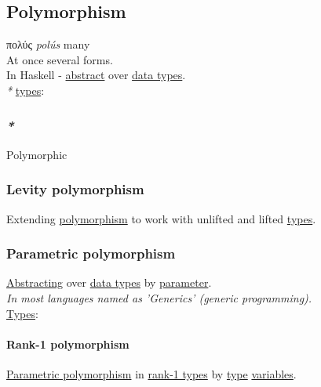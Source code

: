 \documentclass[11pt]{article}
\begin{document}
\subsection{\label{org4bdf515}Polymorphism}
\label{sec:org1aedb96}
πολύς \emph{polús} many\\

At once several forms.\\

In Haskell - \hyperref[org606d002]{abstract} over \hyperref[org88981ee]{data types}.\\

\emph{*} \hyperref[org3927fd9]{types}:\\

\subsubsection{\emph{*}}
\label{sec:org6379881}

\label{org84d7fee}Polymorphic\\

\subsubsection{\label{org1dbe39c}Levity polymorphism}
\label{sec:org202196b}
Extending \hyperref[org4bdf515]{polymorphism} to work with unlifted and lifted \hyperref[org3927fd9]{types}.\\

\subsubsection{\label{org9b7bee7}Parametric polymorphism}
\label{sec:orgb6368f1}
\hyperref[org6035eca]{Abstracting} over \hyperref[org88981ee]{data types} by \hyperref[org45d4a16]{parameter}.\\

\emph{In most languages named as 'Generics' (generic programming).}\\

\hyperref[org3927fd9]{Types}:\\

\paragraph{\label{org43d8060}Rank-1 polymorphism}
\label{sec:orge2950b2}
\hyperref[org9b7bee7]{Parametric polymorphism} in \hyperref[orgb8084b9]{rank-1 types} by \hyperref[org4fbaeb8]{type} \hyperref[orgd3f3ade]{variables}.\\
\end{document}
